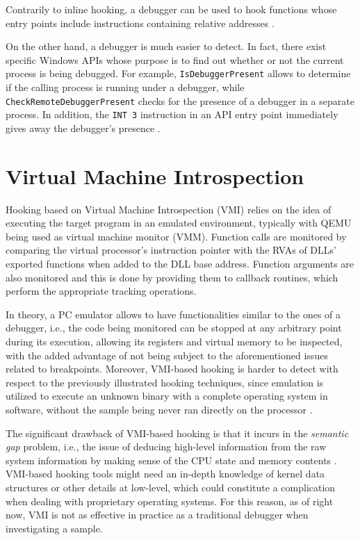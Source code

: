 Contrarily to inline hooking, a debugger can be used to hook functions whose entry points include instructions containing relative addresses \cite{Berdajs:2010:EAU:1815744.1815746}.

On the other hand, a debugger is much easier to detect. In fact, there exist specific Windows APIs whose purpose is to find out whether or not the current process is being debugged. For example, \texttt{IsDebuggerPresent} allows to determine if the calling process is running under a debugger, while \texttt{CheckRemoteDebuggerPresent} checks for the presence of a debugger in a separate process. 
In addition, the \texttt{INT 3} instruction in an API entry point immediately gives away the debugger's presence \cite{HookingDetection}.



\section{Virtual Machine Introspection}

Hooking based on Virtual Machine Introspection (VMI) relies on the idea of executing the target program in an emulated environment, typically with QEMU being used as virtual machine monitor (VMM). Function calls are monitored by comparing the virtual processor's instruction pointer with the RVAs of DLLs' exported functions when added to the DLL base address. Function arguments are also monitored and this is done by providing them to callback routines, which perform the appropriate tracking operations.

In theory, a PC emulator allows to have functionalities similar to the ones of a debugger, i.e., the code being monitored can be stopped at any arbitrary point during its execution, allowing its registers and virtual memory to be inspected, with the added advantage of not being subject to the aforementioned issues related to breakpoints.
Moreover, VMI-based hooking is harder to detect with respect to the previously illustrated hooking techniques, since emulation is utilized to execute an unknown binary with a complete operating system in software, without the sample being never ran directly on the processor \cite{Bayer2005TTAnalyzeA}.

The significant drawback of VMI-based hooking is that it incurs in the \textit{semantic gap} problem, i.e., the issue of deducing high-level information from the raw system information by making sense of the CPU state and memory contents \cite{Egele:2008:SAD:2089125.2089126}. VMI-based hooking tools
might need an in-depth knowledge of kernel data structures or other details at low-level, which could constitute a complication when dealing with proprietary operating systems. For this reason, as of right now, VMI is not as effective in practice as a traditional debugger when investigating a sample.


